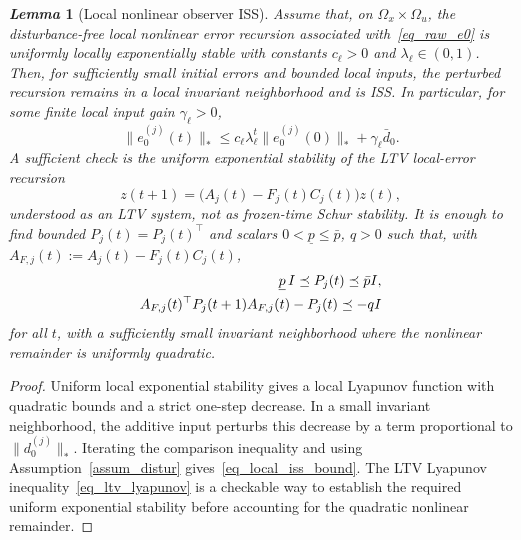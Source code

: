 \documentclass[letterpaper,journal]{IEEEtran}
\newtheorem{lemma}{\it Lemma}%
\begin{document}
\begin{lemma}[Local nonlinear observer ISS]\label{lem_local_iss}
Assume that, on $\Omega_x\times\Omega_u$, the disturbance-free local nonlinear error recursion associated with~\eqref{eq_raw_e0} is uniformly locally exponentially stable with constants $c_{\ell}>0$ and $\lambda_{\ell}\in(0,1)$. Then, for sufficiently small initial errors and bounded local inputs, the perturbed recursion remains in a local invariant neighborhood and is ISS. In particular, for some finite local input gain $\gamma_{\ell}>0$,
\begin{equation}
\|e_0^{(j)}(t)\|_*
\le c_{\ell}\lambda_{\ell}^{t}\|e_0^{(j)}(0)\|_*
+\gamma_{\ell}\bar d_0 .
\label{eq_local_iss_bound}
\end{equation}
A sufficient check is the uniform exponential stability of the LTV local-error recursion
\begin{equation}
z(t+1)=\big(A_j(t)-F_j(t)C_j(t)\big)z(t),
\label{eq_ltv_local_error}
\end{equation}
understood as an LTV system, not as frozen-time Schur stability. It is enough to find bounded $P_j(t)=P_j(t)^\top$ and scalars $0<\underline p\le\bar p$, $q>0$ such that, with $A_{F,j}(t):=A_j(t)-F_j(t)C_j(t)$,
\begin{align}
\underline p\, I \preceq P_j(t)\preceq\bar p I,\notag\\
A_{F,j}(t)^\top P_j(t+1)A_{F,j}(t)-P_j(t)
\preceq-qI
\label{eq_ltv_lyapunov}
\end{align}
for all $t$, with a sufficiently small invariant neighborhood where the nonlinear remainder is uniformly quadratic.
\end{lemma}
\begin{proof}
Uniform local exponential stability gives a local Lyapunov function with quadratic bounds and a strict one-step decrease. In a small invariant neighborhood, the additive input perturbs this decrease by a term proportional to $\|d_0^{(j)}\|_*$. Iterating the comparison inequality and using Assumption~\ref{assum_distur} gives~\eqref{eq_local_iss_bound}. The LTV Lyapunov inequality~\eqref{eq_ltv_lyapunov} is a checkable way to establish the required uniform exponential stability before accounting for the quadratic nonlinear remainder.
\end{proof}
\end{document}
